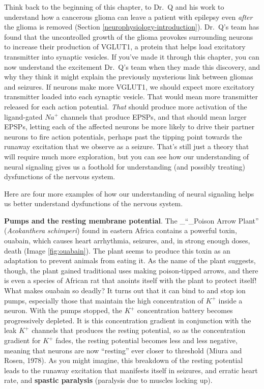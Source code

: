 \documentclass[
]{book}
\begin{document}
Think back to the beginning of this chapter, to Dr.~Q and his work to understand how a cancerous glioma can leave a patient with epilepsy even \emph{after} the glioma is removed (Section \ref{neurophysiology-introduction}). Dr.~Q's team has found that the uncontrolled growth of the glioma provokes surrounding neurons to increase their production of VGLUT1, a protein that helps load excitatory transmitter into synaptic vesicles. If you've made it through this chapter, you can now understand the excitement Dr.~Q's team when they made this discovery, and why they think it might explain the previously mysterious link between gliomas and seizures. If neurons make more VGLUT1, we should expect more excitatory transmitter loaded into each synaptic vesicle. That would mean more transmitter released for each action potential. \emph{That} should produce more activation of the ligand-gated \(Na^+\) channels that produce EPSPs, and that should mean larger EPSPs, letting each of the affected neurons be more likely to drive their partner neurons to fire action potentials, perhaps past the tipping point towards the runaway excitation that we observe as a seizure. That's still just a theory that will require much more exploration, but you can see how our understanding of neural signaling gives us a foothold for understanding (and possibly treating) dysfunctions of the nervous system.

Here are four more examples of how our understanding of neural signaling helps us better understand dysfunctions of the nervous system.

\textbf{Pumps and the resting membrane potential}. The \_``\_Poison Arrow Plant'' (\emph{Acokanthera schimperi}) found in eastern Africa contains a powerful toxin, ouabain, which causes heart arrhythmia, seizures, and, in strong enough doses, death (Image \ref{fig:ouabain}). The plant seems to produce this toxin as an adaptation to prevent animals from eating it. As the name of the plant suggests, though, the plant gained traditional uses making poison-tipped arrows, and there is even a species of African rat that anoints itself with the plant to protect itself! What makes ouabain so deadly? It turns out that it can bind to and stop ion pumps, especially those that maintain the high concentration of \(K^+\) inside a neuron. With the pumps stopped, the \(K^+\) concentration battery becomes progressively depleted. It is this concentration gradient in conjunction with the leak \(K^+\) channels that produces the resting potential, so as the concentration gradient for \(K^+\) fades, the resting potential becomes less and less negative, meaning that neurons are now ``resting'' ever closer to threshold (Miura and Rosen, 1978). As you might imagine, this breakdown of the resting potential leads to the runaway excitation that manifests itself in seizures, and erratic heart rate, and \textbf{spastic paralysis }(paralysis due to muscles locking up).
\end{document}
